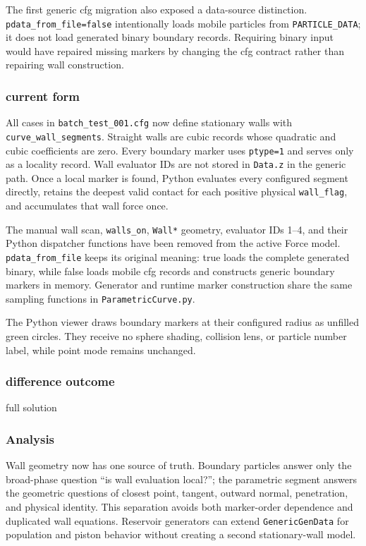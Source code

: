 The first generic cfg migration also exposed a data-source distinction.
\texttt{pdata\_from\_file=false} intentionally loads mobile particles from
\texttt{PARTICLE\_DATA}; it does not load generated binary boundary records.
Requiring binary input would have repaired missing markers by changing the cfg
contract rather than repairing wall construction.

\subsubsection{current form}

All cases in \texttt{batch\_test\_001.cfg} now define stationary walls with
\texttt{curve\_wall\_segments}.  Straight walls are cubic records whose
quadratic and cubic coefficients are zero.  Every boundary marker uses
\texttt{ptype=1} and serves only as a locality record.  Wall evaluator IDs are
not stored in \texttt{Data.z} in the generic path.  Once a local marker is
found, Python evaluates every configured segment directly, retains the deepest
valid contact for each positive physical \texttt{wall\_flag}, and accumulates
that wall force once.

The manual wall scan, \texttt{walls\_on}, \texttt{Wall*} geometry, evaluator
IDs 1--4, and their Python dispatcher functions have been removed from the
active Force model.  \texttt{pdata\_from\_file} keeps its original meaning:
true loads the complete generated binary, while false loads mobile cfg records
and constructs generic boundary markers in memory.  Generator and runtime marker
construction share the same sampling functions in
\texttt{ParametricCurve.py}.

The Python viewer draws boundary markers at their configured radius as unfilled
green circles.  They receive no sphere shading, collision lens, or particle
number label, while point mode remains unchanged.

\subsubsection{difference outcome}

full solution

\subsubsection{Analysis}

Wall geometry now has one source of truth.  Boundary particles answer only the
broad-phase question ``is wall evaluation local?''; the parametric segment
answers the geometric questions of closest point, tangent, outward normal,
penetration, and physical identity.  This separation avoids both marker-order
dependence and duplicated wall equations.  Reservoir generators can extend
\texttt{GenericGenData} for population and piston behavior without creating a
second stationary-wall model.


